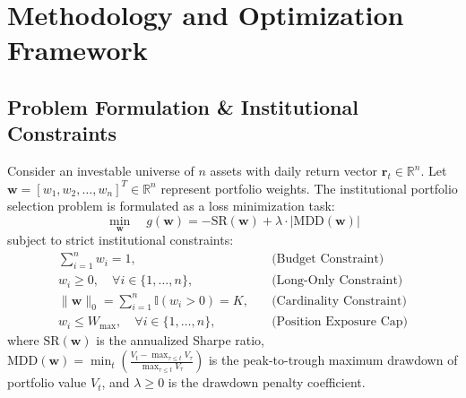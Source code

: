\documentclass[11pt,a4paper]{article}
\begin{document}
\section{Methodology and Optimization Framework}

\subsection{Problem Formulation \& Institutional Constraints}
Consider an investable universe of $n$ assets with daily return vector $\mathbf{r}_t \in \mathbb{R}^n$. Let $\mathbf{w} = [w_1, w_2, \dots, w_n]^T \in \mathbb{R}^n$ represent portfolio weights. The institutional portfolio selection problem is formulated as a loss minimization task:
\begin{equation}
\min_{\mathbf{w}} \quad g(\mathbf{w}) = -\text{SR}(\mathbf{w}) + \lambda \cdot |\text{MDD}(\mathbf{w})|
\end{equation}
subject to strict institutional constraints:
\begin{align}
\sum_{i=1}^n w_i = 1, \quad & \text{(Budget Constraint)} \\
w_i \ge 0, \quad \forall i \in \{1, \dots, n\}, \quad & \text{(Long-Only Constraint)} \\
\|\mathbf{w}\|_0 = \sum_{i=1}^n \mathbb{I}(w_i > 0) = K, \quad & \text{(Cardinality Constraint)} \\
w_i \le W_{\max}, \quad \forall i \in \{1, \dots, n\}, \quad & \text{(Position Exposure Cap)}
\end{align}
where $\text{SR}(\mathbf{w})$ is the annualized Sharpe ratio, $\text{MDD}(\mathbf{w}) = \min_{t} \left( \frac{V_t - \max_{\tau \le t} V_\tau}{\max_{\tau \le t} V_\tau} \right)$ is the peak-to-trough maximum drawdown of portfolio value $V_t$, and $\lambda \ge 0$ is the drawdown penalty coefficient.
\end{document}
